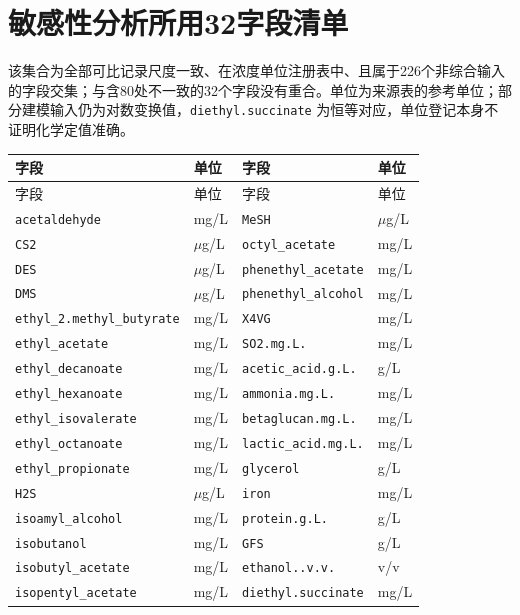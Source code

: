 \section{敏感性分析所用32字段清单}\label{app:fieldsets}
该集合为全部可比记录尺度一致、在浓度单位注册表中、且属于226个非综合输入的字段交集；与含80处不一致的32个字段没有重合。单位为来源表的参考单位；部分建模输入仍为对数变换值，\texttt{diethyl.succinate} 为恒等对应，单位登记本身不证明化学定值准确。
\begin{longtable}{L{0.37\columnwidth}L{0.10\columnwidth}L{0.37\columnwidth}L{0.10\columnwidth}}
\toprule
字段 & 单位 & 字段 & 单位\\
\midrule
\endfirsthead
\toprule
字段 & 单位 & 字段 & 单位\\
\midrule
\endhead
\bottomrule
\endfoot
\texttt{acetaldehyde} & mg/L & \texttt{MeSH} & $\mu$g/L \\
\texttt{CS2} & $\mu$g/L & \texttt{octyl\_acetate} & mg/L \\
\texttt{DES} & $\mu$g/L & \texttt{phenethyl\_acetate} & mg/L \\
\texttt{DMS} & $\mu$g/L & \texttt{phenethyl\_alcohol} & mg/L \\
\texttt{ethyl\_2.\allowbreak{}methyl\_butyrate} & mg/L & \texttt{X4VG} & mg/L \\
\texttt{ethyl\_acetate} & mg/L & \texttt{SO2.\allowbreak{}mg.\allowbreak{}L.\allowbreak{}} & mg/L \\
\texttt{ethyl\_decanoate} & mg/L & \texttt{acetic\_acid.\allowbreak{}g.\allowbreak{}L.\allowbreak{}} & g/L \\
\texttt{ethyl\_hexanoate} & mg/L & \texttt{ammonia.\allowbreak{}mg.\allowbreak{}L.\allowbreak{}} & mg/L \\
\texttt{ethyl\_isovalerate} & mg/L & \texttt{betaglucan.\allowbreak{}mg.\allowbreak{}L.\allowbreak{}} & mg/L \\
\texttt{ethyl\_octanoate} & mg/L & \texttt{lactic\_acid.\allowbreak{}mg.\allowbreak{}L.\allowbreak{}} & mg/L \\
\texttt{ethyl\_propionate} & mg/L & \texttt{glycerol} & g/L \\
\texttt{H2S} & $\mu$g/L & \texttt{iron} & mg/L \\
\texttt{isoamyl\_alcohol} & mg/L & \texttt{protein.\allowbreak{}g.\allowbreak{}L.\allowbreak{}} & g/L \\
\texttt{isobutanol} & mg/L & \texttt{GFS} & g/L \\
\texttt{isobutyl\_acetate} & mg/L & \texttt{ethanol.\allowbreak{}.\allowbreak{}v.\allowbreak{}v.\allowbreak{}} & v/v \\
\texttt{isopentyl\_acetate} & mg/L & \texttt{diethyl.\allowbreak{}succinate} & mg/L \\
\end{longtable}
